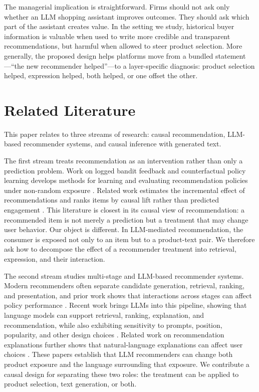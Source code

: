 \documentclass[11pt]{article}
\begin{document}
The managerial implication is straightforward. Firms should not ask only whether an LLM shopping assistant improves outcomes. They should ask which part of the assistant creates value. In the setting we study, historical buyer information is valuable when used to write more credible and transparent recommendations, but harmful when allowed to steer product selection. More generally, the proposed design helps platforms move from a bundled statement---``the new recommender helped''---to a layer-specific diagnosis: product selection helped, expression helped, both helped, or one offset the other.

\section{Related Literature}\label{section:lit}

This paper relates to three streams of research: causal recommendation, LLM-based recommender systems, and causal inference with generated text.

The first stream treats recommendation as an intervention rather than only a prediction problem. Work on logged bandit feedback and counterfactual policy learning develops methods for learning and evaluating recommendation policies under non-random exposure \citep{swaminathan2015counterfactual,schnabel2016recommendations}. Related work estimates the incremental effect of recommendations and ranks items by causal lift rather than predicted engagement \citep{sharma2015estimating,sato2020unbiased,sato2021online}. This literature is closest in its causal view of recommendation: a recommended item is not merely a prediction but a treatment that may change user behavior. Our object is different. In LLM-mediated recommendation, the consumer is exposed not only to an item but to a product-text pair. We therefore ask how to decompose the effect of a recommender treatment into retrieval, expression, and their interaction.

The second stream studies multi-stage and LLM-based recommender systems. Modern recommenders often separate candidate generation, retrieval, ranking, and presentation, and prior work shows that interactions across stages can affect policy performance \citep{ma2020off,hron2021component}. Recent work brings LLMs into this pipeline, showing that language models can support retrieval, ranking, explanation, and recommendation, while also exhibiting sensitivity to prompts, position, popularity, and other design choices \citep{hou2024bridging,hou2024large,lichtenberg2024llm,deldjoo2024understanding,ma2024xrec}. Related work on recommendation explanations further shows that natural-language explanations can affect user choices \citep{rahman2025persuasive}. These papers establish that LLM recommenders can change both product exposure and the language surrounding that exposure. We contribute a causal design for separating these two roles: the treatment can be applied to product selection, text generation, or both.
\end{document}
